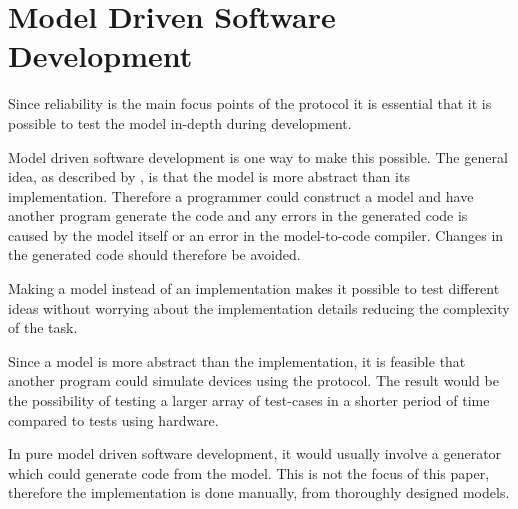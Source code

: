 \section{Model Driven Software Development}
Since reliability is the main focus points of the protocol it is essential that it is possible to test the model in-depth during development.

Model driven software development is one way to make this possible.
The general idea, as described by \citet{beydeda2005model}, is that the model is more abstract than its implementation.
Therefore a programmer could construct a model and have another program generate the code and any errors in the generated code is caused by the model itself or an error in the model-to-code compiler.
Changes in the generated code should therefore be avoided.

Making a model instead of an implementation makes it possible to test different ideas without worrying about the implementation details reducing the complexity of the task.

Since a model is more abstract than the implementation, it is feasible that another program could simulate devices using the protocol.
The result would be the possibility of testing a larger array of test-cases in a shorter period of time compared to tests using hardware.

In pure model driven software development, it would usually involve a generator which could generate code from the model. 
This is not the focus of this paper, therefore the implementation is done manually, from thoroughly designed models.
